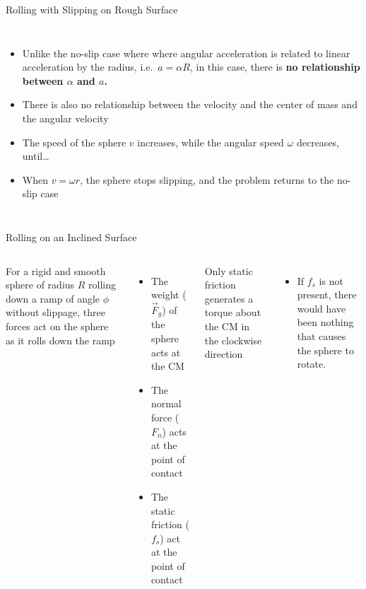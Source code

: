 \documentclass[12pt,compress,aspectratio=169]{beamer}
\begin{document}
\begin{frame}{Rolling with Slipping on Rough Surface}
  \begin{columns}
    

    \begin{itemize}
    \item Unlike the no-slip case where where angular acceleration is related
      to linear acceleration by the radius, i.e.\ $a=\alpha R$, in this case,
      there is \textbf{no relationship between $\alpha$ and $a$.}
    \item There is also no relationship between the velocity and the center
      of mass and the angular velocity
    \item The speed of the sphere $v$ increases, while the angular speed
      $\omega$ decreases, until\ldots
    \item When $v=\omega r$, the sphere stops slipping, and the problem returns
      to the no-slip case
    \end{itemize}
  \end{columns}
\end{frame}



\begin{frame}{Rolling on an Inclined Surface}
  \begin{columns}
    

    For a rigid and smooth sphere of radius $R$ rolling down a ramp of angle
    $\phi$ without slippage, three forces act on the sphere as it rolls down
    the ramp
    \begin{itemize}
    \item The weight ($\vec F_g$) of the sphere acts at the CM
    \item The normal force ($F_n$) acts at the point of contact
    \item The static friction ($f_s$) act at the point of contact
    \end{itemize}
    Only static friction generates a torque about the CM in the clockwise
    direction
    \begin{itemize}
    \item If $f_s$ is not present, there would have been nothing that causes
      the sphere to rotate.
    \end{itemize}
  \end{columns}
\end{frame}
\end{document}
